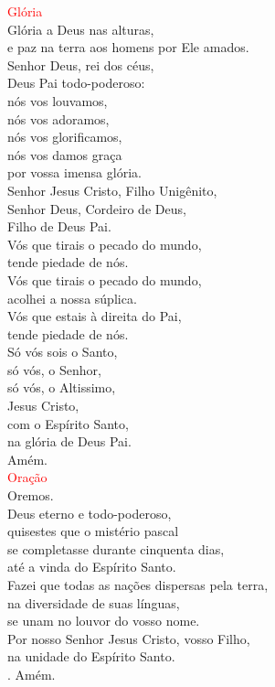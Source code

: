 \documentclass{book}
\begin{document}
\begin{flushleft}
    \newpage

    \textcolor{red}{Glória}
    \vspace{.2cm} \\
    Glória a Deus nas alturas, \\
    e paz na terra aos homens por Ele amados. \\
    Senhor Deus, rei dos céus, \\
    Deus Pai todo-poderoso: \\
    nós vos louvamos, \\
    nós vos adoramos, \\
    nós vos glorificamos, \\
    nós vos damos graça \\
    por vossa imensa glória. \\
    Senhor Jesus Cristo, Filho Unigênito, \\
    Senhor Deus, Cordeiro de Deus, \\
    Filho de Deus Pai. \\
    Vós que tirais o pecado do mundo, \\
    tende piedade de nós. \\
    Vós que tirais o pecado do mundo, \\
    acolhei a nossa súplica. \\
    Vós que estais à direita do Pai, \\
    tende piedade de nós. \\
    Só vós sois o Santo, \\
    só vós, o Senhor, \\
    só vós, o Altissimo, \\
    Jesus Cristo, \\
    com o Espírito Santo, \\
    na glória de Deus Pai. \\
    Amém.
    \vspace{.2cm} \\
    \textcolor{red}{Oração}
    \vspace{.1cm} \\
    Oremos.
    \vspace{.1cm}\\
    Deus eterno e todo-poderoso, \\
    quisestes que o mistério pascal \\
    se completasse durante cinquenta dias, \\
    até a vinda do Espírito Santo. \\
    Fazei que todas as nações dispersas pela terra, \\
    na diversidade de suas línguas, \\
    se unam no louvor do vosso nome. \\
    Por nosso Senhor Jesus Cristo, vosso Filho, \\
    na unidade do Espírito Santo.\\
    {\color{red} \Rbar.} Amém.

\end{flushleft}
\end{document}

